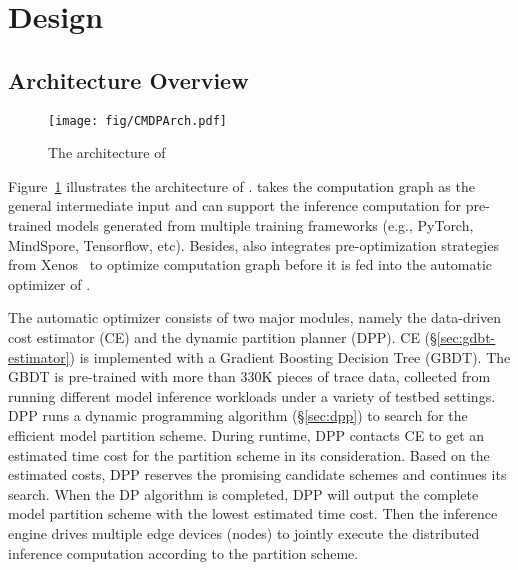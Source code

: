 \section{\sysname Design}
\label{sec-design}
\subsection{Architecture Overview}
\begin{figure}[t]
	\centering
	\texttt{[image: fig/CMDPArch.pdf]}
	\caption{The architecture of \sysname}
	\label{fig:arch}
\end{figure}
Figure~\ref{fig:arch} illustrates the architecture of \sysname. \sysname takes the computation graph as the general intermediate input and can 
support the inference computation for pre-trained models generated from multiple training frameworks (e.g., PyTorch, MindSpore, Tensorflow, etc). Besides, \sysname also integrates pre-optimization strategies from Xenos~\cite{zhang2023xenos} to optimize computation graph before it is fed into the automatic optimizer of \sysname.

The automatic optimizer consists of two major modules, namely the data-driven cost estimator (CE) and the dynamic partition planner (DPP). CE (\S\ref{sec:gdbt-estimator}) is implemented with a Gradient Boosting Decision Tree (GBDT). The GBDT is pre-trained with more than 330K pieces of trace data, collected from running different model inference workloads under a variety of testbed settings. DPP runs a dynamic programming algorithm (\S\ref{sec:dpp}) to search for the efficient model partition scheme. During runtime, DPP contacts CE to get an estimated time cost for the partition scheme in its consideration. Based on the estimated costs, DPP reserves the promising candidate schemes and continues its search. When the DP algorithm is completed, DPP will output the complete model partition scheme with the lowest estimated time cost. Then the inference engine drives multiple edge devices (nodes) to jointly execute the distributed inference computation according to the partition scheme. %



